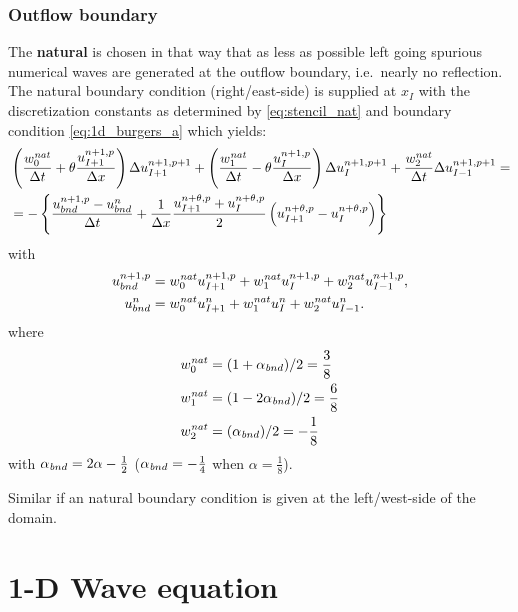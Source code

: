 \subsubsection{Outflow boundary}
The \textbf{natural} is chosen in that way that as less as possible left going spurious numerical waves are generated at the outflow boundary, i.e.\ nearly no reflection.
The natural boundary condition (right/east-side) is supplied at $x_I$ with the discretization constants as determined by \autoref{eq:stencil_nat} and boundary condition \autoref{eq:1d_burgers_a} which yields:
\begin{align}
    &\left( \frac{w^{\it nat}_0}{\Delta t} + \theta \frac{u^{n+1,p}_{I+1}}{\Delta x} \right) \Delta u^{n+1,p+1}_{I+1} +
    \left( \frac{w^{\it nat}_1}{\Delta t} - \theta \frac{u^{n+1,p}_{I}}{\Delta x} \right) \Delta u^{n+1,p+1}_I +
    \frac{w^{\it nat}_2}{\Delta t}  \Delta u^{n+1,p+1}_{I-1}  =
    \nonumber \\
    & = - \left\{
    \frac{u^{n+1,p}_{bnd} - u^{n}_{bnd}}{\Delta t} +
    \frac{1}{\Delta x}
    \frac{u^{n+\theta,p}_{I+1} + u^{n+\theta,p}_{I}}{2}
    \left(u^{n+\theta,p}_{I+1} - u^{n+\theta,p}_{I} \right)
    \right\}
\end{align}
with
\begin{align}
u^{n+1,p}_{bnd} &
= w^{\it nat}_0 u^{n+1,p}_{I+1}
+ w^{\it nat}_1 u^{n+1,p}_{I  }
+ w^{\it nat}_2 u^{n+1,p}_{I-1},
\\
u^{n}_{bnd} &
= w^{\it nat}_0 u^{n}_{I+1}
+ w^{\it nat}_1 u^{n}_{I  }
+ w^{\it nat}_2 u^{n}_{I-1}.
\end{align}
where
\begin{align}
    w^{\it nat}_0 & = (1+\alpha_{\mathit bnd})/2 = \frac{3}{8}
    \\
    w^{\it nat}_1 & = (1 - 2\alpha_{\mathit bnd})/2 = \frac{6}{8}
    \\
    w^{\it nat}_2 & = (\alpha_{\mathit bnd})/2 = -\frac{1}{8}
\end{align}
with $\alpha_{\mathit bnd} = 2\alpha -\frac{1}{2}$ ($\alpha_{\mathit bnd} = -\frac{1}{4}$ when $\alpha = \frac{1}{8}$).

Similar if an natural boundary condition is given at the left/west-side of the domain.

\section{1-D Wave equation}

